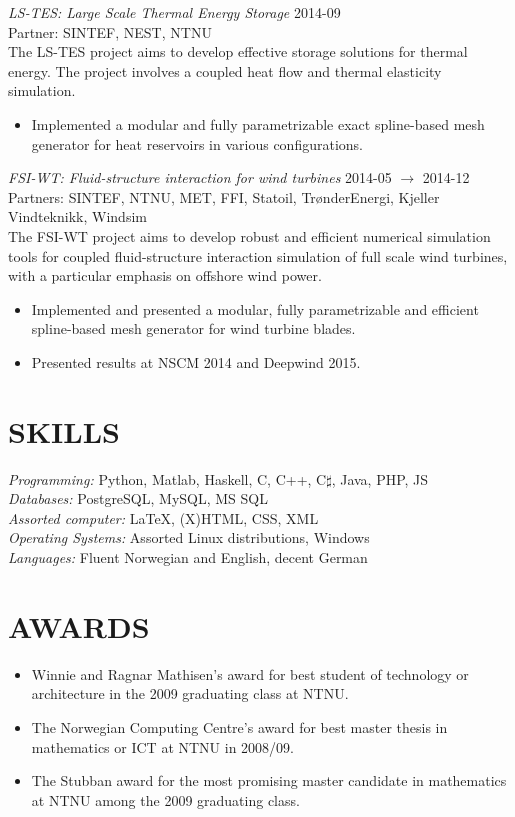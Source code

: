 \documentclass[line,margin]{res}
\begin{document}
\begin{resume}
{\em LS-TES: Large Scale Thermal Energy Storage} \hfill 2014-09 \\
{\small Partner: SINTEF, NEST, NTNU} \\
The LS-TES project aims to develop effective storage solutions for thermal
energy. The project involves a coupled heat flow and thermal elasticity
simulation.
\begin{itemize}
\item Implemented a modular and fully parametrizable exact spline-based mesh
  generator for heat reservoirs in various configurations.
\end{itemize}

{\em FSI-WT: Fluid-structure interaction for wind turbines}
\hfill 2014-05 $\to$ 2014-12 \\
{\small Partners: SINTEF, NTNU, MET, FFI, Statoil, TrønderEnergi, Kjeller Vindteknikk, Windsim} \\
The FSI-WT project aims to develop robust and efficient numerical simulation
tools for coupled fluid-structure interaction simulation of full scale wind
turbines, with a particular emphasis on offshore wind power.
\begin{itemize}
\item Implemented and presented a modular, fully parametrizable and efficient
  spline-based mesh generator for wind turbine blades.
\item Presented results at  NSCM 2014 and  Deepwind 2015.
\end{itemize}


\section{SKILLS}

{\em Programming:} Python, Matlab, Haskell, C, C++, C$\sharp$, Java, PHP, JS \\
{\em Databases:} PostgreSQL, MySQL, MS SQL \\
{\em Assorted computer:} \LaTeX, (X)HTML, CSS, XML \\
{\em Operating Systems:} Assorted Linux distributions, Windows \\
{\em Languages:} Fluent Norwegian and English, decent German


\section{AWARDS}

\begin{itemize}
\item Winnie and Ragnar Mathisen's award for best student of technology
  or architecture in the 2009 graduating class at NTNU.
\item The Norwegian Computing Centre's award for best master thesis in
  mathematics or ICT at NTNU in 2008/09.
\item The Stubban award for the most promising master candidate in
  mathematics at NTNU among the 2009 graduating class.
\end{itemize}



\end{resume}
\end{document}
